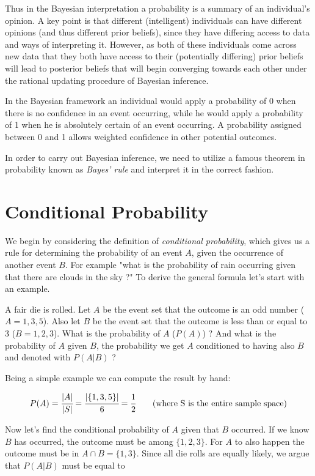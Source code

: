 Thus in the Bayesian interpretation a probability is a summary of an individual's opinion. A key point is that different (intelligent) individuals can have different opinions (and thus different prior beliefs), since they have differing access to data and ways of interpreting it. However, as both of these individuals come across new data that they both have access to their (potentially differing) prior beliefs will lead to posterior beliefs that will begin converging towards each other under the rational updating procedure of Bayesian inference.

In the Bayesian framework an individual would apply a probability of 0 when there is no confidence in an event occurring, while he would apply a probability of 1 when he is absolutely certain of an event occurring. A probability assigned between 0 and 1 allows weighted confidence in other potential outcomes.

In order to carry out Bayesian inference, we need to utilize a famous theorem in probability known as \emph{Bayes' rule} and interpret it in the correct fashion.

\section{Conditional Probability}
\label{sec:conditional_prob}
We begin by considering the definition of \emph{conditional probability}, which gives us a rule for determining the probability of an event $A$, given the occurrence of another event $B$. For example "what is the probability of rain occurring given that there are clouds in the sky ?"
To derive the general formula let's start with an example.

A fair die is rolled. Let $A$ be the event set that the outcome is an odd number ($A={1,3,5}$). Also let $B$ be the event set that the outcome is less than or equal to $3$ ($B={1,2,3}$). What is the probability of $A$ ($P(A)$) ? And what is the probability of $A$ given $B$, the probability we get $A$ conditioned to having also $B$ and denoted with $P(A|B)$ ?

Being a simple example we can compute the result by hand:

\begin{equation}
P(A) = \cfrac{|A|}{|S|} = \cfrac{|\{1,3,5\}|}{6} = \cfrac{1}{2}\qquad\textrm{(where S is the entire sample space)}
\end{equation}

Now let's find the conditional probability of $A$ given that $B$ occurred. If we know $B$ has occurred, the outcome must be among $\{1,2,3\}$. For $A$ to also happen the outcome must be in $A\cap B = \{1,3\}$. Since all die rolls are equally likely, we argue that $P(A|B)$ must be equal to

